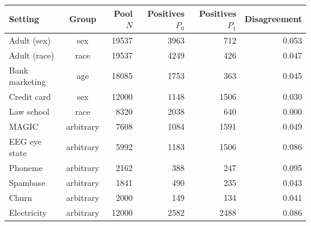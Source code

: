 \begin{tabular}{lcrrrr}\toprule
Setting & Group & Pool $N$ & Positives $P_0$ & Positives $P_1$ & Disagreement \\\midrule
Adult (sex) & sex & 19537 & 3963 & 712 & 0.053 \\
Adult (race) & race & 19537 & 4249 & 426 & 0.047 \\
Bank marketing & age & 18085 & 1753 & 363 & 0.045 \\
Credit card & sex & 12000 & 1148 & 1506 & 0.030 \\
Law school & race & 8320 & 2038 & 640 & 0.000 \\
MAGIC & arbitrary & 7608 & 1084 & 1591 & 0.049 \\
EEG eye state & arbitrary & 5992 & 1183 & 1506 & 0.086 \\
Phoneme & arbitrary & 2162 & 388 & 247 & 0.095 \\
Spambase & arbitrary & 1841 & 490 & 235 & 0.043 \\
Churn & arbitrary & 2000 & 149 & 134 & 0.041 \\
Electricity & arbitrary & 12000 & 2582 & 2488 & 0.086 \\
\bottomrule\end{tabular}